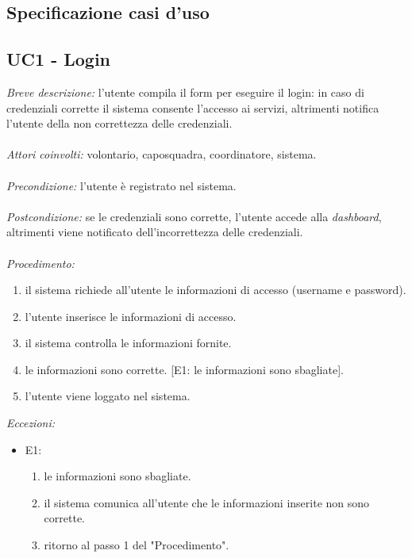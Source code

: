 \subsection{Specificazione casi d'uso}

\subsection{UC1 - Login}
\textit{Breve descrizione:} l'utente compila il form per eseguire il login: in caso di credenziali corrette il sistema consente l'accesso ai servizi, altrimenti notifica l'utente della non correttezza delle credenziali. 
\\
\\
\textit{Attori coinvolti:} volontario, caposquadra, coordinatore, sistema.
\\
\\
\textit{Precondizione:} l'utente è registrato nel sistema.
\\
\\
\textit{Postcondizione:} se le credenziali sono corrette, l'utente accede alla \textit{dashboard}, altrimenti viene notificato dell'incorrettezza delle credenziali.
\\
\\
\textit{Procedimento:}
\begin{enumerate}
	\item il sistema richiede all'utente le informazioni di accesso (username e password).
	\item l'utente inserisce le informazioni di accesso.
	\item il sistema controlla le informazioni fornite.
	\item le informazioni sono corrette. [E1: le informazioni sono sbagliate].
	\item l'utente viene loggato nel sistema.
\end{enumerate}


\textit{Eccezioni:}
\begin{itemize}
	\item E1:
	\begin{enumerate}
		\item le informazioni sono sbagliate.
		\item il sistema comunica all'utente che le informazioni inserite non sono corrette.
		\item ritorno al passo 1 del "Procedimento".
	\end{enumerate}
\end{itemize}

